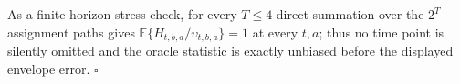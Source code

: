 As a finite-horizon stress check, for every \(T\le4\) direct summation over the \(2^T\) assignment paths gives \(\mathbb E\{H_{t,b,a}/\upsilon_{t,b,a}\}=1\) at every \(t,a\); thus no time point is silently omitted and the oracle statistic is exactly unbiased before the displayed envelope error. \(\square\)